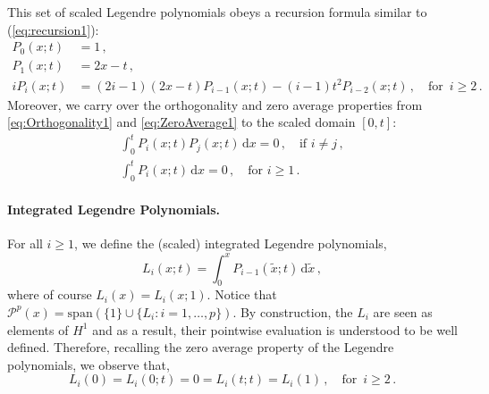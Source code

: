 This set of scaled Legendre polynomials obeys a recursion formula similar to (\ref{eq:recursion1}):
\begin{equation}
	\begin{aligned}
		P_0(x;t)&=1 \,,\\
		P_1(x;t)&=2x-t \,,\\
		iP_i(x;t)&=(2i-1)( 2x - t) P_{i-1}(x; t) - (i-1)t^2 P_{i-2}(x; t) \,, \quad \text{for }\, i\geq2\, .
	\end{aligned}
\label{eq:recursion2}
\end{equation}
Moreover, we carry over the orthogonality and zero average properties from \eqref{eq:Orthogonality1} and \eqref{eq:ZeroAverage1} to the scaled domain $[0,t]$:
\begin{equation}
	\begin{gathered}
		\int_{0}^{t} P_i(x;t)P_j(x;t)\,\mathrm{d}x=0\,, \quad \text{if } i\neq j\,,\\
		\int_{0}^{t} P_i(x;t)\,\mathrm{d}x=0\,, \quad \text{for } i\geq1\,.
	\end{gathered}
	\label{eq:ZeroAverage2}
\end{equation}

\paragraph{Integrated Legendre Polynomials.}

For all $i\geq1$, we define the (scaled) integrated Legendre polynomials,
\begin{equation}
	L_{i}(x; t) = \int_0^{x} P_{i-1}(\tilde{x}; t)\, \mathrm{d}\tilde{x}\,,
\end{equation}
where of course $L_i(x)=L_i(x;1)$. Notice that $\mathcal{P}^{p}(x)=\mathrm{span}(\{1\}\cup\{L_i:i=1,\ldots,p\})$. By construction, the $L_i$ are seen as elements of $H^1$ and as a result, their pointwise evaluation is understood to be well defined. Therefore, recalling the zero average property of the Legendre polynomials, we observe that,
\begin{equation}
	L_i(0)=L_i(0;t)=0=L_i(t;t)=L_i(1)\,,\quad\text{for }\,i\geq2\,.\label{eq:Lvanishatendpoints}
\end{equation}

